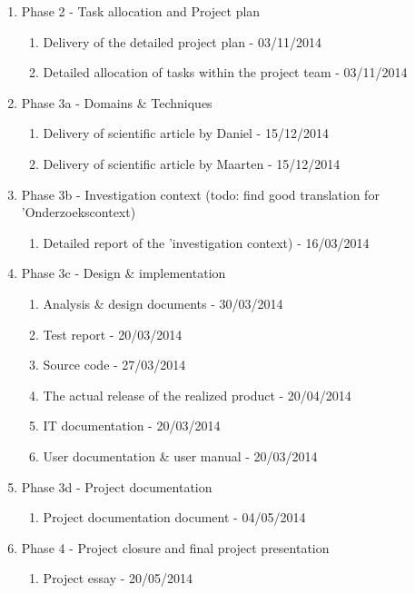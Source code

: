  \begin{enumerate}
	\item Phase 2 - Task allocation and Project plan
 	\begin{enumerate}
		\item Delivery of the detailed project plan 			- 	03/11/2014
		\item Detailed allocation of tasks within the project team 	- 	03/11/2014
	\end {enumerate}
	\item Phase 3a - Domains \& Techniques
 	\begin{enumerate}
		\item Delivery of scientific article by Daniel			- 	15/12/2014
		\item Delivery of scientific article by Maarten  			- 	15/12/2014
	\end {enumerate}
 	\item Phase 3b - Investigation context (todo: find good translation for 'Onderzoekscontext)
 	\begin{enumerate}
		\item Detailed report of the 'investigation context)  		- 	16/03/2014
	\end {enumerate}
 	\item Phase 3c - Design \& implementation
 	\begin{enumerate}
		\item Analysis \& design documents  				- 	30/03/2014
		\item Test report  							- 	20/03/2014
		\item Source code  							- 	27/03/2014
		\item The actual release of the realized product  		- 	20/04/2014
		\item IT documentation  						- 	20/03/2014
		\item User documentation \& user manual  			- 	20/03/2014
	\end {enumerate}
 	\item Phase 3d - Project documentation
 	\begin{enumerate}
		\item Project documentation document				- 	04/05/2014
	\end {enumerate}
	\item Phase 4 - Project closure and final project presentation
 	\begin{enumerate}
		\item Project essay							- 	20/05/2014
	\end {enumerate}
\end {enumerate}

